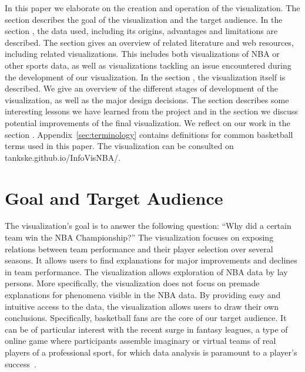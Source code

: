\documentclass[]{sigchi}
\begin{document}
In this paper we elaborate on the creation and operation of the visualization.
The section  describes the goal of the visualization and the
target audience. In the section , the data used, including its origins, advantages and limitations are described. The section  gives an overview of related literature and web resources, including related
visualizations. This includes both visualizations of NBA or other sports data,
as well as visualizations tackling an issue encountered during the development of
our visualization. In the section , the visualization itself is described. We give an overview of the different stages of development
of the visualization, as well as the major design decisions.
The section  describes some interesting lessons we have learned from the project and in the section  we discuss potential  improvements of the final visualization. We reflect on our work in the section . Appendix~\ref{sec:terminology} contains definitions for common basketball terms used in this paper. The visualization can 
be consulted on tankske.github.io/InfoVisNBA/.

\section{Goal and Target Audience}\label{sec:goal} 
The visualization's goal is to answer the following question:
``Why did a certain team win the NBA Championship?'' The visualization focuses
on exposing relations between team performance and their player selection over
several seasons. It allows users to find explanations for major improvements and
declines in team performance.  The visualization allows exploration of NBA data
by lay persons.  More specifically, the visualization does not focus on premade
explanations for phenomena visible in the NBA data. By providing easy and
intuitive access to the data, the visualization allows users to draw their own
conclusions. Specifically,
basketball fans are the core of our target audience. It can be of particular
interest with the recent surge in fantasy leagues, a type of online game where participants assemble imaginary or virtual teams of real players of a professional sport, for which data analysis is
paramount to a player's success~\cite{fantasy,fantasyskill}.
\end{document}
